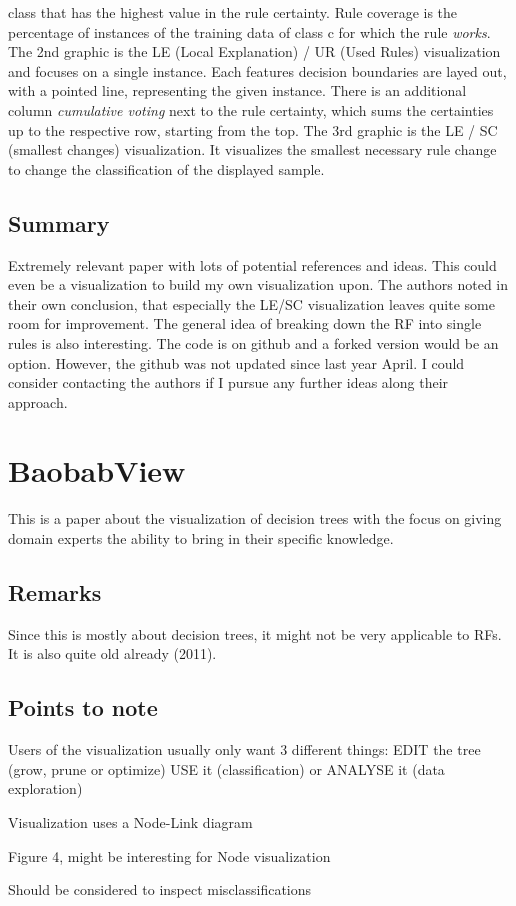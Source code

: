 \documentclass[a4paper, 12pt]{article}
\begin{document}
class that has the highest value in the rule certainty. Rule coverage is the percentage of instances of the
training data of class c for which the rule \textit{works}.
The 2nd graphic is the LE (Local Explanation) / UR (Used Rules) visualization and focuses on a single instance.
Each features decision boundaries are layed out, with a pointed line, representing the given instance.
There is an additional column \textit{cumulative voting} next to the rule certainty, which sums the certainties
up to the respective row, starting from the top.
The 3rd graphic is the LE / SC (smallest changes) visualization. It visualizes the smallest necessary rule change
to change the classification of the displayed sample.

\subsection{Summary}
Extremely relevant paper with lots of potential references and ideas. This could even be a visualization to build
my own visualization upon. The authors noted in their own conclusion, that especially the LE/SC visualization
leaves quite some room for improvement. The general idea of breaking down the RF into single rules is also
interesting. The code is on github and a forked version would be an option. However, the github was not updated
since last year April. I could consider contacting the authors if I pursue any further ideas along their approach.

\section{BaobabView}
This \cite{van2011baobabview} is a paper about the visualization of decision trees with the focus on giving domain
experts the ability to bring in their specific knowledge.
\subsection{Remarks}
Since this is mostly about decision trees, it might not be very applicable to RFs. It is also quite old already
(2011).
\subsection{Points to note}
\begin{description}[font=$\bullet$~\normalfont]
        \item[User requirements]Users of the visualization usually only want 3 different things: EDIT the tree (grow,
        prune or optimize) USE it (classification) or ANALYSE it (data exploration)
        \item [Node-Link diagram] Visualization uses a Node-Link diagram
        \item [Streamgraphs]Figure 4, might be interesting for Node visualization
        \item [Confusion Matrix]Should be considered to inspect misclassifications
\end{description}
\end{document}

